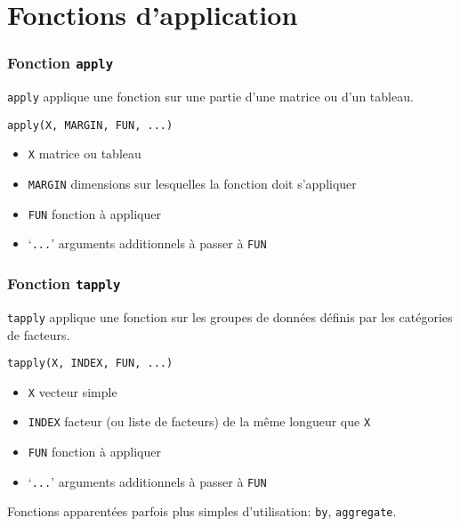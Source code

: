 \section{Fonctions d'application}

\begin{frame}[fragile]
  \frametitle{Fonction \texttt{apply}}

  \texttt{apply} applique une fonction sur une partie d'une
  \alert{matrice} ou d'un \alert{tableau}.
  \begin{Schunk}
\begin{lstlisting}
apply(X, MARGIN, FUN, ...)
\end{lstlisting}
  \end{Schunk}
  \begin{itemize}
  \item \texttt{X} matrice ou tableau
  \item \texttt{MARGIN} dimensions sur lesquelles la fonction doit
    s'appliquer
  \item \texttt{FUN} fonction à appliquer
  \item `\texttt{...}' arguments additionnels à passer à \texttt{FUN}
  \end{itemize}

  \pause
\end{frame}

\begin{frame}[fragile=singleslide]
  \frametitle{Fonction \texttt{tapply}}

  \texttt{tapply} applique une fonction sur les \alert{groupes de données}
  définis par les catégories de \alert{facteurs}.
  \begin{Schunk}
\begin{lstlisting}
tapply(X, INDEX, FUN, ...)
\end{lstlisting}
  \end{Schunk}
  \begin{itemize}
  \item \texttt{X} vecteur simple
  \item \texttt{INDEX} facteur (ou liste de facteurs) de la même longueur que \texttt{X}
  \item \texttt{FUN} fonction à appliquer
  \item `\texttt{...}' arguments additionnels à passer à \texttt{FUN}
  \end{itemize}

  Fonctions apparentées parfois plus simples d'utilisation:
  \texttt{by}, \texttt{aggregate}.
\end{frame}

